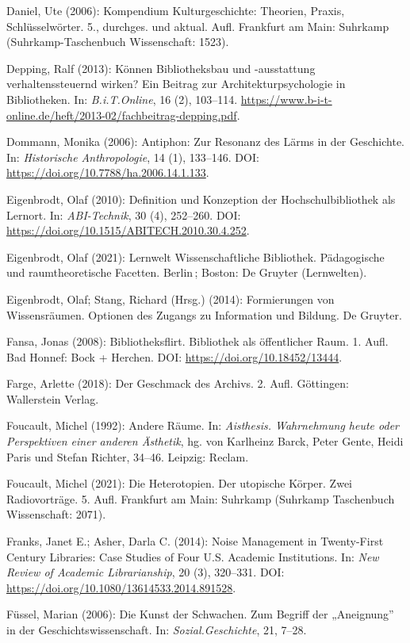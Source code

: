 \documentclass[a4paper,
fontsize=11pt,
oneside,
numbers=noperiodatend,
parskip=half-,
bibliography=totoc,
final
]{scrartcl}
\begin{document}
Daniel, Ute (2006): Kompendium Kulturgeschichte: Theorien, Praxis,
Schlüsselwörter. 5., durchges. und aktual. Aufl. Frankfurt am Main:
Suhrkamp (Suhrkamp-Taschenbuch Wissenschaft: 1523).

Depping, Ralf (2013): Können Bibliotheksbau und -ausstattung
verhaltenssteuernd wirken? Ein Beitrag zur Architekturpsychologie in
Bibliotheken. In: \emph{B.i.T.Online}, 16 (2), 103--114.
\url{https://www.b-i-t-online.de/heft/2013-02/fachbeitrag-depping.pdf}.

Dommann, Monika (2006): Antiphon: Zur Resonanz des Lärms in der
Geschichte. In: \emph{Historische Anthropologie}, 14 (1), 133--146. DOI:
\url{https://doi.org/10.7788/ha.2006.14.1.133}.

Eigenbrodt, Olaf (2010): Definition und Konzeption der
Hochschulbibliothek als Lernort. In: \emph{ABI-Technik}, 30 (4),
252--260. DOI: \url{https://doi.org/10.1515/ABITECH.2010.30.4.252}.

Eigenbrodt, Olaf (2021): Lernwelt Wissenschaftliche Bibliothek.
Pädagogische und raumtheoretische Facetten. Berlin\,; Boston: De Gruyter
(Lernwelten).

Eigenbrodt, Olaf; Stang, Richard (Hrsg.) (2014): Formierungen von
Wissensräumen. Optionen des Zugangs zu Information und Bildung. De
Gruyter.

Fansa, Jonas (2008): Bibliotheksflirt. Bibliothek als öffentlicher Raum.
1. Aufl. Bad Honnef: Bock + Herchen. DOI:
\url{https://doi.org/10.18452/13444}.

Farge, Arlette (2018): Der Geschmack des Archivs. 2. Aufl. Göttingen:
Wallerstein Verlag.

Foucault, Michel (1992): Andere Räume. In: \emph{Aisthesis. Wahrnehmung
heute oder Perspektiven einer anderen Ästhetik}, hg. von Karlheinz
Barck, Peter Gente, Heidi Paris und Stefan Richter, 34--46. Leipzig:
Reclam.

Foucault, Michel (2021): Die Heterotopien. Der utopische Körper. Zwei
Radiovorträge. 5. Aufl. Frankfurt am Main: Suhrkamp (Suhrkamp
Taschenbuch Wissenschaft: 2071).

Franks, Janet E.; Asher, Darla C. (2014): Noise Management in
Twenty-First Century Libraries: Case Studies of Four U.S. Academic
Institutions. In: \emph{New Review of Academic Librarianship}, 20 (3),
320--331. DOI: \url{https://doi.org/10.1080/13614533.2014.891528}.

Füssel, Marian (2006): Die Kunst der Schwachen. Zum Begriff der
„Aneignung'' in der Geschichtswissenschaft. In:
\emph{Sozial.Geschichte}, 21, 7--28.
\end{document}
